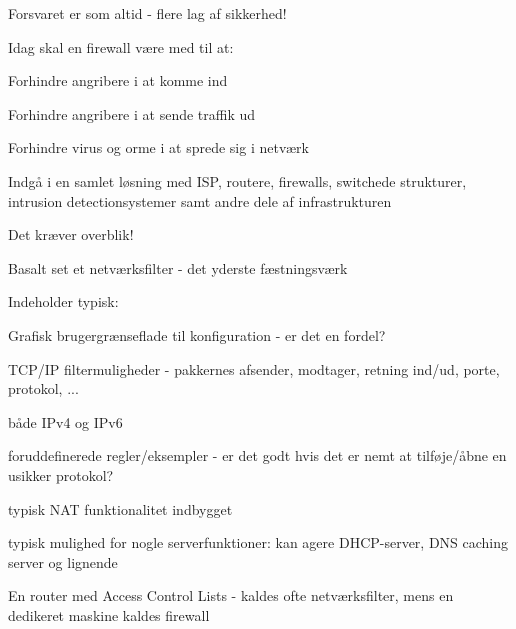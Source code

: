 \documentclass[Screen16to9,17pt]{foils}
\begin{document}


\centerline{\hlkbig Forsvaret er som altid - flere lag af sikkerhed! }




\begin{list1}
\item Idag skal en firewall være med til at:
\begin{list2}
\item Forhindre angribere i at komme ind
\item Forhindre angribere i at sende traffik ud
\item Forhindre virus og orme i at sprede sig i netværk
\item Indgå i en samlet løsning med ISP, routere, firewalls, switchede
  strukturer, intrusion detectionsystemer samt andre dele af infrastrukturen
\end{list2}
\item Det kræver overblik!
\end{list1}




\begin{list1}
\item Basalt set et netværksfilter - det yderste fæstningsværk
\item Indeholder typisk:
  \begin{list2}
   \item Grafisk brugergrænseflade til konfiguration - er det en
   fordel?
\item TCP/IP filtermuligheder - pakkernes afsender, modtager, retning
  ind/ud, porte, protokol, ...
\item både IPv4 og IPv6
\item foruddefinerede regler/eksempler - er det godt hvis det er nemt
  at tilføje/åbne en usikker protokol?
\item typisk NAT funktionalitet indbygget
\item typisk mulighed for nogle serverfunktioner: kan agere
  DHCP-server, DNS caching server og lignende
  \end{list2}
\item En router med Access Control Lists - kaldes ofte netværksfilter,
  mens en dedikeret maskine kaldes firewall
\end{list1}
\end{document}
